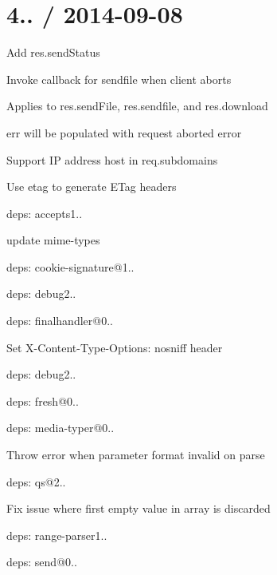 \section*{4.. / 2014-\/09-\/08 }


\begin{DoxyItemize}
\item Add {\ttfamily res.\+send\+Status}
\item Invoke callback for sendfile when client aborts
\begin{DoxyItemize}
\item Applies to {\ttfamily res.\+send\+File}, {\ttfamily res.\+sendfile}, and {\ttfamily res.\+download}
\item {\ttfamily err} will be populated with request aborted error
\end{DoxyItemize}
\item Support I\+P address host in {\ttfamily req.\+subdomains}
\item Use {\ttfamily etag} to generate {\ttfamily E\+Tag} headers
\item deps\+: accepts1..
\begin{DoxyItemize}
\item update {\ttfamily mime-\/types}
\end{DoxyItemize}
\item deps\+: cookie-\/signature@1..
\item deps\+: debug2..
\item deps\+: finalhandler@0..
\begin{DoxyItemize}
\item Set {\ttfamily X-\/\+Content-\/\+Type-\/\+Options\+: nosniff} header
\item deps\+: debug2..
\end{DoxyItemize}
\item deps\+: fresh@0..
\item deps\+: media-\/typer@0..
\begin{DoxyItemize}
\item Throw error when parameter format invalid on parse
\end{DoxyItemize}
\item deps\+: qs@2..
\begin{DoxyItemize}
\item Fix issue where first empty value in array is discarded
\end{DoxyItemize}
\item deps\+: range-\/parser1..
\item deps\+: send@0..

\end{DoxyItemize}

